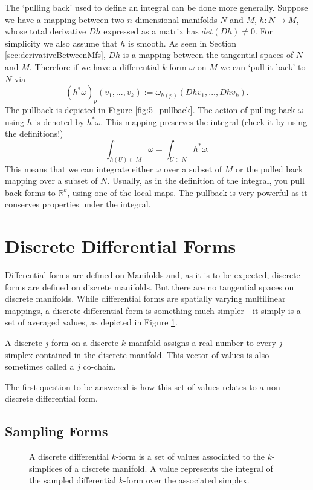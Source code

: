 The `pulling back' used to define an integral can be done more generally. Suppose we have a mapping between two $n$-dimensional manifolds $N$ and $M$, $h: N\to M$, whose total derivative $Dh$ expressed as a matrix has $det(Dh) \neq 0$. For simplicity we also assume that $h$ is smooth. As seen in Section \ref{sec:derivativeBetweenMfs}, $Dh$ is a mapping between the tangential spaces of $N$ and $M$. Therefore if we have a differential $k$-form $\omega$ on $M$ we can `pull it back' to $N$ via
\[(h^*\omega)_p (v_1,...,v_k) := \omega_{h(p)}(Dh v_1,...,Dh v_k). \]
The pullback is depicted in Figure \ref{fig:5_pullback}. The action of pulling back $\omega$ using $h$ is denoted by $h^* \omega$. This mapping preserves the integral (check it by using the definitions!)
\[\int_{h(U)\subset M} \omega = \int_{U \subset N} h^*\omega.\]
This means that we can integrate either $\omega$ over a subset of $M$ or the pulled back mapping over a subset of $N$. Usually, as in the definition of the integral, you pull back forms to $\mathbb R^k$, using one of the local maps.
The pullback is very powerful as it conserves properties under the integral. 

\section{Discrete Differential Forms}

Differential forms are defined on Manifolds and, as it is to be expected, discrete forms are defined on discrete manifolds. But there are no tangential spaces on discrete manifolds. While differential forms are spatially varying multilinear mappings, a discrete differential form is something much simpler - it simply is a set of averaged values, as depicted in Figure \ref{fig:5_discreteForms}.

\begin{definition}
A discrete $j$-form on a discrete $k$-manifold assigns a real number to every $j$-simplex contained in the discrete manifold. This vector of values is also sometimes called a $j$ co-chain. 
\end{definition}
The first question to be answered is how this set of values relates to a non-discrete differential form.

\subsection{Sampling Forms}
\label{subsec:samplingForms}

\begin{figure}%
\begin{center}
\def\svgwidth{0.8\columnwidth}

\end{center}
\caption{A discrete differential $k$-form is a set of values associated to the $k$-simplices of a discrete manifold. A value represents the integral of the sampled differential $k$-form over the associated simplex.}%
\label{fig:5_discreteForms}%
\end{figure}

